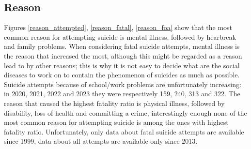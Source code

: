 \documentclass{article}
\begin{document}
\subsection{Reason}
%
%
Figures \ref{reason_attempted}, \ref{reason_fatal}, \ref{reason_foa}
show that the most common reason for attempting suicide 
is mental illness, followed by hearbreak and family problems.
When considering fatal suicide attempts, mental illness is the reason 
that increased the most, although this might be regarded as a reason lead to
by other reasons; this is why it is not easy to decide what are the social
diseases to work on to contain the phenomenon of suicides as much as possible. 
Suicide attempts because of school/work problems are unfortunately increasing: in 2020, 2021, 2022 and 2023
they were respectively 159, 240, 313 and 322.
The reason that caused the highest fatality ratio is physical illness, followed by disability,
loss of health and committing a crime, interestingly enough none of the most common reason for attempting
suicide is among the ones with highest fatality ratio.
Unfortunately, only data about fatal suicide attempts are available since 1999,
data about all attempts are available only since 2013.
\end{document}
